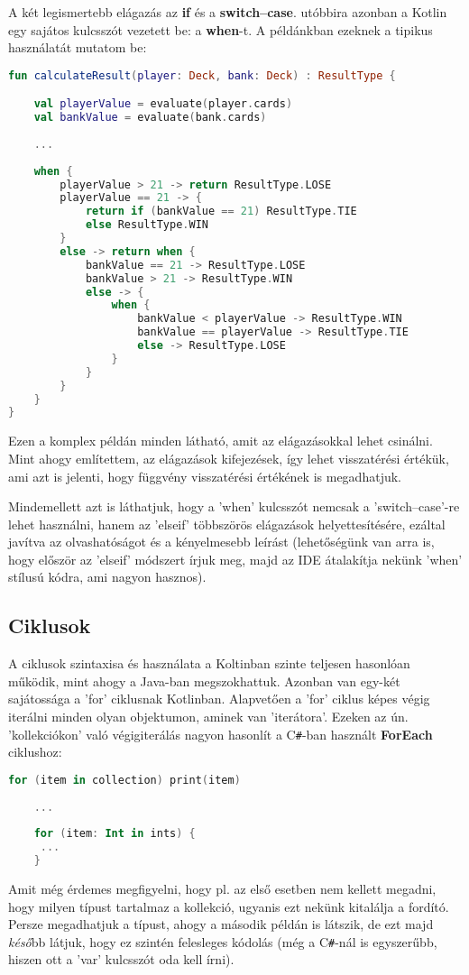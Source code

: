 A két legismertebb elágazás az \textbf{if} és a \textbf{switch--case}. utóbbira azonban a Kotlin egy sajátos kulcsszót vezetett be: a \textbf{when}-t. A példánkban ezeknek a tipikus használatát mutatom be:
\scriptsize
\begin{lstlisting}[language = Kotlin]
fun calculateResult(player: Deck, bank: Deck) : ResultType {

	val playerValue = evaluate(player.cards)
	val bankValue = evaluate(bank.cards)
	
	...
	
	when {
		playerValue > 21 -> return ResultType.LOSE
		playerValue == 21 -> {
			return if (bankValue == 21) ResultType.TIE
			else ResultType.WIN
		}
		else -> return when {
			bankValue == 21 -> ResultType.LOSE
			bankValue > 21 -> ResultType.WIN
			else -> {
				when {
					bankValue < playerValue -> ResultType.WIN
					bankValue == playerValue -> ResultType.TIE
					else -> ResultType.LOSE
				}
			}
		}
	}
}
\end{lstlisting}
\normalsize
Ezen a komplex példán minden látható, amit az elágazásokkal lehet csinálni. Mint ahogy említettem, az elágazások kifejezések, így lehet visszatérési értékük, ami azt is jelenti, hogy függvény visszatérési értékének is megadhatjuk. 

Mindemellett azt is láthatjuk, hogy a 'when' kulcsszót nemcsak a 'switch--case'-re lehet használni, hanem az 'elseif' többszörös elágazások helyettesítésére, ezáltal javítva az olvashatóságot és a kényelmesebb leírást (lehetőségünk van arra is, hogy először az 'elseif' módszert írjuk meg, majd az IDE átalakítja nekünk 'when' stílusú kódra, ami nagyon hasznos). 

\subsection{Ciklusok}
\label{subsec:k_loop}

A ciklusok szintaxisa és használata a Koltinban szinte teljesen hasonlóan működik, mint ahogy a Java-ban megszokhattuk. Azonban van egy-két sajátossága a 'for' ciklusnak Kotlinban. Alapvetően a 'for' ciklus képes végig iterálni minden olyan objektumon, aminek van 'iterátora'. Ezeken az ún. 'kollekciókon' való végigiterálás nagyon hasonlít a C\verb|#|-ban használt \textbf{ForEach} ciklushoz:
\scriptsize
\begin{lstlisting}[language = Kotlin]
	for (item in collection) print(item)
	
	...
	
	for (item: Int in ints) {
	 ...
	}
\end{lstlisting}
\normalsize
Amit még érdemes megfigyelni, hogy pl. az első esetben nem kellett megadni, hogy milyen típust tartalmaz a kollekció, ugyanis ezt nekünk kitalálja a fordító. Persze megadhatjuk a típust, ahogy a második példán is látszik, de ezt majd \textsl{késő}bb látjuk, hogy ez szintén felesleges kódolás (még a C\verb|#|-nál is egyszerűbb, hiszen ott a 'var' kulcsszót oda kell írni).

